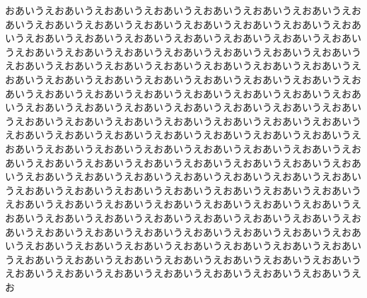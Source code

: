 \documentclass[luatex,fontsize=8pt,paper=b5,twoside,report,tate]{jlreq}%
\begin{document}
おあいうえおあいうえおあいうえおあいうえおあいうえおあいうえおあいうえおあいうえおあいうえおあいうえおあいうえおあいうえおあいうえおあいうえおあいうえおあいうえおあいうえおあいうえおあいうえおあいうえおあいうえおあいうえおあいうえおあいうえおあいうえおあいうえおあいうえおあいうえおあいうえおあいうえおあいうえおあいうえおあいうえおあいうえおあいうえおあいうえおあいうえおあいうえおあいうえおあいうえおあいうえおあいうえおあいうえおあいうえおあいうえおあいうえおあいうえおあいうえおあいうえおあいうえおあいうえおあいうえおあいうえおあいうえおあいうえおあいうえおあいうえおあいうえおあいうえおあいうえおあいうえおあいうえおあいうえおあいうえおあいうえおあいうえおあいうえおあいうえおあいうえおあいうえおあいうえおあいうえおあいうえおあいうえおあいうえおあいうえおあいうえおあいうえおあいうえおあいうえおあいうえおあいうえおあいうえおあいうえおあいうえおあいうえおあいうえおあいうえおあいうえおあいうえおあいうえおあいうえおあいうえおあいうえおあいうえおあいうえおあいうえおあいうえおあいうえおあいうえおあいうえおあいうえおあいうえおあいうえおあいうえおあいうえおあいうえおあいうえおあいうえおあいうえおあいうえおあいうえおあいうえおあいうえおあいうえおあいうえおあいうえおあいうえおあいうえおあいうえおあいうえおあいうえおあいうえおあいうえおあいうえおあいうえおあいうえおあいうえおあいうえおあいうえおあいうえおあいうえおあいうえおあいうえおあいうえおあいうえおあいうえおあいうえおあいうえおあいうえおあいうえおあいうえおあいうえおあいうえお
\end{document}
